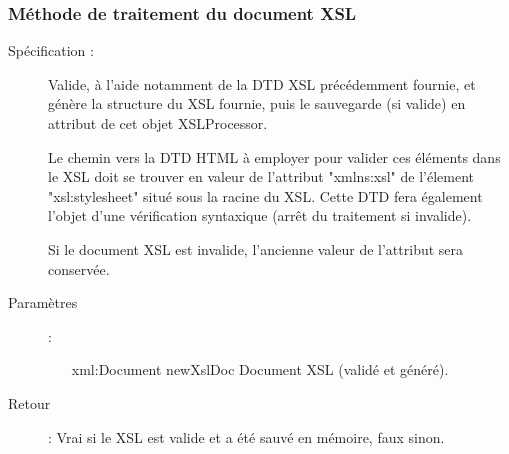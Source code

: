 \documentclass[10pt,a4paper]{article}
\begin{document}
\subsubsection{Méthode de traitement du document XSL}
\begin{description}
\item[Spécification :] Valide, à l’aide notamment de la DTD XSL précédemment fournie, et génère la structure du XSL fournie, puis le sauvegarde (si valide) en attribut de cet objet XSLProcessor.

Le chemin vers la DTD HTML à employer pour valider ces éléments dans le XSL doit se trouver en valeur de l’attribut "xmlns:xsl" de l’élement "xsl:stylesheet" situé sous la racine du XSL. Cette DTD fera également l’objet d’une vérification syntaxique (arrêt du traitement si invalide).

Si le document XSL est invalide, l’ancienne valeur de l’attribut sera conservée.

\item[Paramètres] :
\begin{itemize}
\item[xml:Document newXslDoc] Document XSL (validé et généré).
\end{itemize}

\item[Retour] : Vrai si le XSL est valide et a été sauvé en mémoire, faux sinon.
\end{description}
\end{document}
